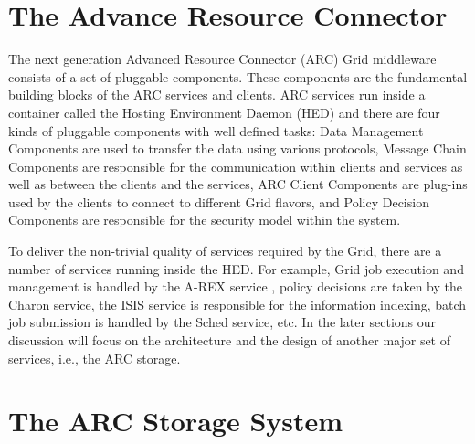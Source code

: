 \documentclass[final]{ieee}
\begin{document}






\section{The Advance Resource Connector}
\label{The Advance Resource Connector}

The next generation Advanced Resource Connector (ARC) Grid middleware 
\cite{NorduGridsite} \cite{KnowARCsite} consists of a set of pluggable 
components. These components are the
fundamental building blocks of the ARC services and clients. ARC
services run inside a container called the Hosting Environment
Daemon (HED) and there are four kinds of pluggable components with well
defined tasks: Data Management Components are used to transfer the
data using various protocols, Message Chain Components are
responsible for the communication within clients and services as well as
between the clients and the services, ARC Client Components are
plug-ins used by the clients to connect to different Grid flavors, and
Policy Decision Components are responsible for the security model
within the system.

To deliver the non-trivial quality of services required by the Grid,
there are a number of services running inside the HED. For example, Grid
job execution and management is handled by the A-REX service 
\cite{AREXdesigndoc}, policy
decisions are taken by the Charon service, the ISIS service is
responsible for the information indexing, batch job submission is
handled by the Sched service, etc. In the later sections our discussion
will focus on the architecture and the design of another major set
of services, i.e., the ARC storage. 

\section{The ARC Storage System}
\label{The ARC Storage System}
\end{document}
